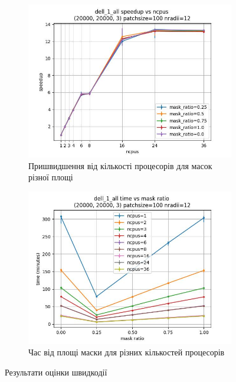 \begin{figure}[h]
    \begin{subfigure}{0.45\textwidth}
    \includegraphics[width=0.99\linewidth]{img/fastlbp/speedup_ncpus.jpg}
    \caption{
        Пришвидшення від кількості процесорів для масок різної площі
    }
    \label{fig:parallell-efficiency-b}
    \end{subfigure}%
    \begin{subfigure}{0.45\textwidth}
    \includegraphics[width=0.99\linewidth]{img/fastlbp/time_mr.jpg}
    \caption{
        Час від площі маски для різних кількостей процесорів
    }
    \label{fig:parallell-efficiency-с}
    \end{subfigure}
    
    \caption{Результати оцінки швидкодії}
    \label{fig:parallell-efficiency}
\end{figure}